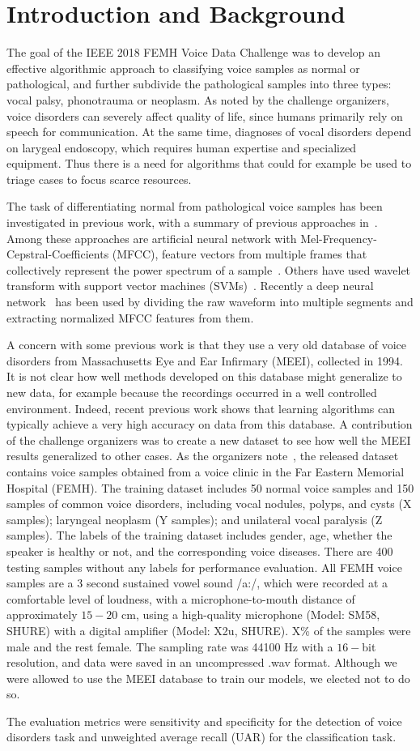 \section{Introduction and Background}
The goal of the IEEE 2018 FEMH Voice Data Challenge was to develop an effective algorithmic approach to classifying voice samples as normal or pathological, and further subdivide the pathological samples into three types: vocal palsy, phonotrauma or neoplasm. As noted by the challenge organizers, voice disorders can severely affect quality of life, since humans primarily rely on speech for communication. At the same time, diagnoses of vocal disorders depend on larygeal endoscopy, which requires human expertise and specialized equipment. Thus there is a need for algorithms that could for example be used to triage cases to focus scarce resources.

The task of differentiating normal from pathological voice samples has been investigated in previous work, with a summary of previous approaches in~\cite{b9}. Among these approaches are artificial neural network with Mel-Frequency-Cepstral-Coefficients (MFCC), feature vectors from multiple frames that collectively represent the power spectrum of a sample~\cite{b5}. Others have used wavelet transform with support vector machines (SVMs)~\cite{b4}. Recently a deep neural network~\cite{b9} has been used by dividing the raw waveform into multiple segments and extracting normalized MFCC features from them.

A concern with some previous work is that they use a very old database of voice disorders from Massachusetts Eye and Ear Infirmary (MEEI), collected in 1994. It is not clear how well methods developed on this database might generalize to new data, for example because the recordings occurred in a well controlled environment. Indeed, recent previous work shows that learning algorithms can typically achieve a very high accuracy on data from this database. A contribution of the challenge organizers was to create a new dataset to see how well the MEEI results generalized to other cases. As the organizers note~\cite{}, the released dataset contains voice samples obtained from a voice clinic in the Far Eastern Memorial Hospital (FEMH). The training dataset includes 50 normal voice samples and 150 samples of common voice disorders, including vocal nodules, polyps, and cysts (X samples); laryngeal neoplasm (Y samples); and unilateral vocal paralysis (Z samples). The labels of the training dataset includes gender, age, whether the speaker is healthy or not, and the corresponding voice diseases. There are 400 testing samples without any labels for performance evaluation. All FEMH voice samples are a 3 second sustained vowel sound /a:/, which were recorded at a comfortable level of loudness, with a microphone-to-mouth distance of approximately $15-20$ cm, using a high-quality microphone (Model: SM58, SHURE) with a digital amplifier (Model: X2u, SHURE). X\% of the samples were male and the rest female. The sampling rate was 44100 Hz with a $16-$bit resolution, and data were saved in an uncompressed .wav format. Although we were allowed to use the MEEI database to train our models, we elected not to do so.

The evaluation metrics were sensitivity and specificity for the detection of voice disorders task and unweighted average recall (UAR) for the classification task.
